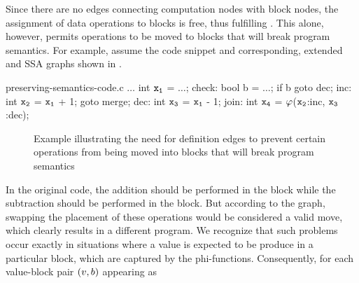 Since there are no \glspl{edge} connecting \glspl{computation node} with
\glspl{block node}, the assignment of data \glspl{operation} to \glspl{block} is
free, thus fulfilling .
%
This alone, however, permits \glspl{operation} to be moved to \glspl{block} that
will break \gls{program} semantics.
%
For example, assume the code snippet and corresponding, extended
 and \glspl{SSA graph} shown in
.
%
\begin{filecontents*}{preserving-semantics-code.c}
  $\ldots$
  int $\irVar{x}[1]$ = $\ldots$;
check:
  bool b = $\ldots$;
  if b goto dec;
inc:
  int $\irVar{x}[2]$ = $\irVar{x}[1]$ + 1;
  goto merge;
dec:
  int $\irVar{x}[3]$ = $\irVar{x}[1]$ - 1;
join:
  int $\irVar{x}[4]$ = $\mPhi$($\irVar{x}[2]$:inc, $\irVar{x}[3]$:dec);
\end{filecontents*}
%
\begin{figure}
  \centering

  \mbox{}%
  \hfill%
  \hfill\hfill\hfill%
  \hfill%
  \mbox{}

  \caption[Example illustrating the need for definition edges]%
          {%
            Example illustrating the need for definition edges to prevent
            certain operations from being moved into blocks that will break
            program semantics%
          }
\end{figure}
%
In the original code, the addition should be performed in the 
\gls{block} while the subtraction should be performed in the 
\gls{block}.
%
But according to the \gls{graph}, swapping the placement of these
\glspl{operation} would be considered a valid move, which clearly results in a
different \gls{program}.
%
We recognize that such problems occur exactly in situations where a value is
expected to be produce in a particular \gls{block}, which are captured by the
\glspl{phi-function}.
%
Consequently, for each value-\gls{block} pair \mbox{$\mPair{v}{b}$} appearing as
